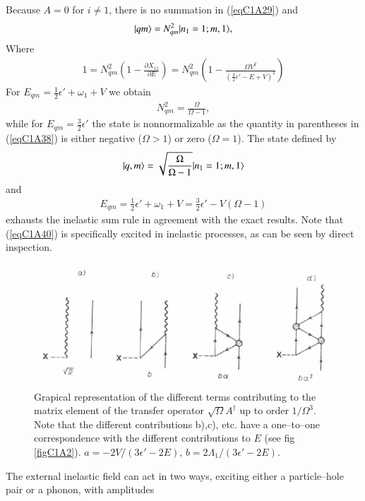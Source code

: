 Because $A=0$ for $i\neq 1$, there is no summation in (\ref{eqC1A29}) and
 \begin{align}\label{eqC1A37} 
|{qm} \rangle=N^2_{qm}|{n_1=1;m,1} \rangle,
 \end{align}
Where
 \begin{align}\label{eqC1A38} 
1=N^2_{qm}\left(1-\frac{\partial X_{11}}{\partial E}\right)=N^2_{qm}\left(1-\frac{\Omega V^2}{\left(\frac{3}{2}\epsilon'-E+V\right)^2}\right)
 \end{align}
For $E_{qm}=\frac{1}{2}\epsilon'+\omega_1+V$ we obtain
 \begin{align}\label{eqC1A39} 
 N^2_{qm}=\frac{\Omega}{\Omega-1},
 \end{align}
while for $E_{qm}=\frac{3}{2}\epsilon'$ the state is nonnormalizable as the quantity in parentheses
in (\ref{eqC1A38}) is either negative ($\Omega>1$) or zero ($\Omega=1$).
The state defined by
 \begin{align}\label{eqC1A40} 
|{q,m} \rangle=\sqrt{\frac{\Omega}{\Omega-1}}|{n_1=1;m,1} \rangle
 \end{align}
and 
 \begin{align}\label{eqC1A41} 
E_{qm}=\frac{1}{2}\epsilon'+\omega_1+V=\frac{3}{2}\epsilon'-V(\Omega-1)
 \end{align}
exhausts the inelastic sum rule in agreement with the exact results. Note
that (\ref{eqC1A40}) is specifically excited in inelastic processes, as can be seen by
direct inspection.
  \begin{figure}
  \centerline {
  \includegraphics*[width=12cm]{introduccion/figs/fig20}
  }
  \caption{Grapical representation of the different terms contributing to the matrix element of the transfer operator $\sqrt{\Omega}A^\dagger$ up to order $1/\Omega^3$. Note that the different contributions b),c), etc. have a one--to--one correspondence with the different contributions to $E$ (see fig \ref{figC1A2}). $a=-2V/(3\epsilon'-2E),\,b=2\Lambda_1/(3\epsilon'-2E)$.}
  \label{figC1A3}
  \end{figure}
The external inelastic field can act in two ways, exciting either a particle--hole pair or a phonon, with amplitudes 
